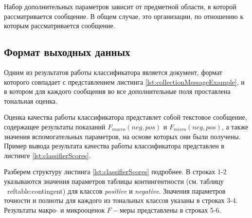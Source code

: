     Набор дополнительных параметров зависит от предметной области, в которой
    рассматривается сообщение. В общем случае, это организации, по отношению к
    которым рассматривается сообщение.

    \subsection{Формат выходных данных}
    Одним из результатов работы классификатора является \xml
    документ, формат которого совпадает с представлением листинга \ref{lst:collectionMessageExample},
    и в котором для каждого сообщения во все дополнительные поля проставлена
    тональная оценка.

    Оценка качества работы классификатора представлет собой текстовое сообщение,
    содержащее результаты показаний  $F_{macro}(neg, pos)$ и $F_{micro}(neg, pos)$,
    а также значения вспомогательных параметров, на основе которых они были
    получены. Пример вывода результата качества работы классификатора представлен
    в листинге \ref{lst:classifierScores}.

    \lstset{style=bash, numbers=left}
    

    Разберем структуру листинга \ref{lst:classifierScores} подробнее. В строках 1-2
    указываются значения параметров таблицы контингентности (см. таблицу \
    ref{table:contingent}) для классов {\it positive} и {\it negative}. Значения параметров точности и
    полноты для каждого из тональных классов указаны в строках 3-4. Результаты
    макро- и микрооценок $F-$меры представлены в строках 5-6.


